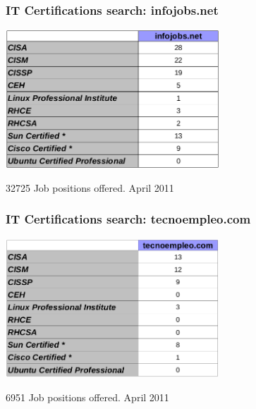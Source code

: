 \documentclass{beamer}
\begin{document}

\begin{frame}
\frametitle{IT Certifications search: infojobs.net}
\begin{center}
  \includegraphics[width=8cm]{figs/infojobs.png}
\end{center}
\begin{center}
\normalsize{32725 Job positions offered. April 2011}
\end{center}
\end{frame}


\begin{frame}
\frametitle{IT Certifications search: tecnoempleo.com}
\begin{center}
  \includegraphics[width=8cm]{figs/tecnoempleo.png}
\end{center}
\begin{center}
\normalsize{6951 Job positions offered. April 2011}
\end{center}
\end{frame}


\end{document}
